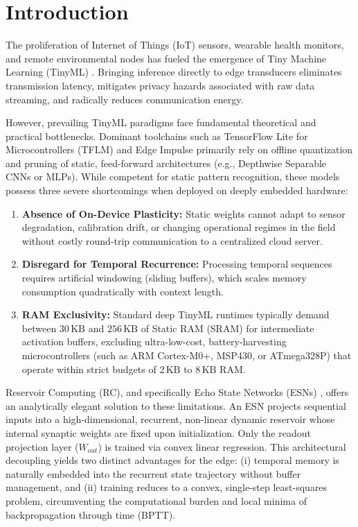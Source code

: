 \section{Introduction}

The proliferation of Internet of Things (IoT) sensors, wearable health monitors, and remote environmental nodes has fueled the emergence of Tiny Machine Learning (TinyML) \cite{warden2019tinyml}. Bringing inference directly to edge transducers eliminates transmission latency, mitigates privacy hazards associated with raw data streaming, and radically reduces communication energy. 

However, prevailing TinyML paradigms face fundamental theoretical and practical bottlenecks. Dominant toolchains such as TensorFlow Lite for Microcontrollers (TFLM) and Edge Impulse primarily rely on offline quantization and pruning of static, feed-forward architectures (e.g., Depthwise Separable CNNs or MLPs). While competent for static pattern recognition, these models possess three severe shortcomings when deployed on deeply embedded hardware:
\begin{enumerate}
    \item \textbf{Absence of On-Device Plasticity:} Static weights cannot adapt to sensor degradation, calibration drift, or changing operational regimes in the field without costly round-trip communication to a centralized cloud server.
    \item \textbf{Disregard for Temporal Recurrence:} Processing temporal sequences requires artificial windowing (sliding buffers), which scales memory consumption quadratically with context length.
    \item \textbf{RAM Exclusivity:} Standard deep TinyML runtimes typically demand between $30\,\text{KB}$ and $256\,\text{KB}$ of Static RAM (SRAM) for intermediate activation buffers, excluding ultra-low-cost, battery-harvesting microcontrollers (such as ARM Cortex-M0+, MSP430, or ATmega328P) that operate within strict budgets of $2\,\text{KB}$ to $8\,\text{KB}$ RAM.
\end{enumerate}

Reservoir Computing (RC), and specifically Echo State Networks (ESNs) \cite{jaeger2001echo, lukovsevivc2009reservoir}, offers an analytically elegant solution to these limitations. An ESN projects sequential inputs into a high-dimensional, recurrent, non-linear dynamic reservoir whose internal synaptic weights are fixed upon initialization. Only the readout projection layer ($W_{out}$) is trained via convex linear regression. This architectural decoupling yields two distinct advantages for the edge: (i) temporal memory is naturally embedded into the recurrent state trajectory without buffer management, and (ii) training reduces to a convex, single-step least-squares problem, circumventing the computational burden and local minima of backpropagation through time (BPTT).


